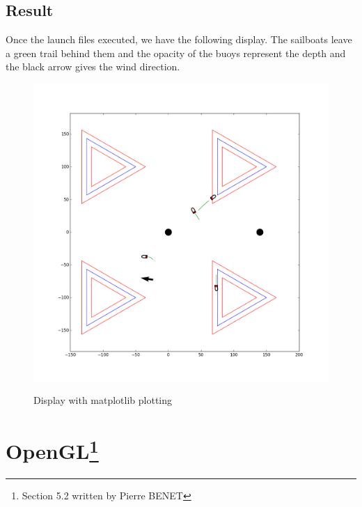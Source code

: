 \documentclass[a4paper]{report}
\begin{document}
\subsection{Result}

Once the launch files executed, we have the following display. The sailboats leave a green trail behind them and the opacity of the buoys represent the depth and the black arrow gives the wind direction. 

\begin{figure}[H]
  \centering
  \includegraphics[scale = 0.4]{image/display3.png}
  \label{Flow}
  \caption{Display with matplotlib plotting }
\end{figure}




\section[OpenGl]{OpenGL\footnote{Section 5.2 written by Pierre BENET}}
\end{document}
